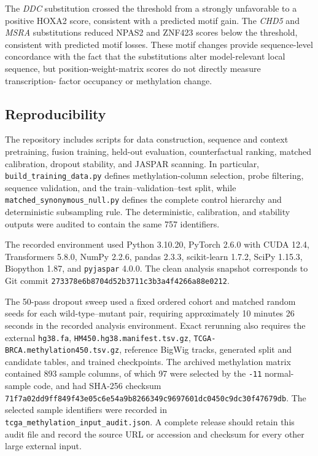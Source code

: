 \documentclass[10pt,letterpaper,twocolumn]{article}
\begin{document}
The \textit{DDC} substitution crossed the threshold from a strongly
unfavorable to a positive HOXA2 score, consistent with a predicted motif
gain. The \textit{CHD5} and \textit{MSRA} substitutions reduced NPAS2
and ZNF423 scores below the threshold, consistent with predicted motif
losses. These motif changes provide sequence-level concordance with the
fact that the substitutions alter model-relevant local sequence, but
position-weight-matrix scores do not directly measure transcription-
factor occupancy or methylation change.

\subsection{Reproducibility}

The repository includes scripts for data construction, sequence and
context pretraining, fusion training, held-out evaluation,
counterfactual ranking, matched calibration, dropout stability, and
JASPAR scanning. In particular, \texttt{build\_training\_data.py}
defines methylation-column selection, probe filtering, sequence
validation, and the train--validation--test split, while
\texttt{matched\_synonymous\_null.py} defines the complete control
hierarchy and deterministic subsampling rule. The deterministic,
calibration, and stability outputs were audited to contain the same 757
identifiers.

The recorded environment used Python 3.10.20, PyTorch 2.6.0 with CUDA
12.4, Transformers 5.8.0, NumPy 2.2.6, pandas 2.3.3, scikit-learn
1.7.2, SciPy 1.15.3, Biopython 1.87, and \texttt{pyjaspar} 4.0.0. The
clean analysis snapshot corresponds to Git commit
\texttt{273378e6b8704d52b3711c3b3a4f4266a88e0212}.

The 50-pass dropout sweep used a fixed ordered cohort and matched random
seeds for each wild-type--mutant pair, requiring approximately 10
minutes 26 seconds in the recorded analysis environment. Exact rerunning
also requires the external \texttt{hg38.fa},
\texttt{HM450.hg38.manifest.tsv.gz},
\texttt{TCGA-BRCA.methylation450.tsv.gz}, reference BigWig tracks,
generated split and candidate tables, and trained checkpoints. The
archived methylation matrix contained 893 sample columns, of which 97
were selected by the \texttt{-11} normal-sample code, and had SHA-256
checksum
\texttt{71f7a02dd9ff849f43e05c6e54a9b8266349c9697601dc0450c9dc30f47679db}.
The selected sample identifiers were recorded in
\texttt{tcga\_methylation\_input\_audit.json}. A complete release
should retain this audit file and record the source URL or accession and
checksum for every other large external input.
\end{document}
